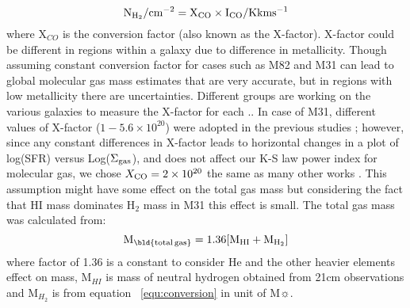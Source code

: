 \documentclass[useAMS,usenatbib]{mn2e}
\begin{document}
\begin{equation}
\label{equ:conversion}
\rm N_{H_2}/\rm cm^{-2} = X_{CO} \times I_{CO}/\rm K km s^{-1}
\end{equation}
where X$_{CO}$ is the conversion factor (also known as the X-factor). X-factor could be different in regions within a galaxy due to difference in metallicity. Though assuming constant conversion factor for cases such as M82 and M31 can lead to global molecular gas mass estimates that are very accurate,  but in regions with low metallicity there are uncertainties. Different groups are working on the various galaxies to measure the X-factor for each \citep{Wilson95, Bosselli02, Bolato13}.. In case of M31, different values of X-factor ($1-5.6 \times 10^{20}$) were adopted in the previous studies \citep[e.g.][]{Ford13, Bolato13, Leroy11, Bolato08, Nieten06, Sofue94, Strong88}; however, since any constant differences in X-factor leads to horizontal changes in a plot of log(SFR) versus Log($\Sigma_{\rm {gas}}$), and does not affect our K-S law power index for molecular gas,  we chose $X_{\rm {CO}}= 2 \times 10^{20}$  the same as many other works \citep[e.g.][]{Ford13, Smith12}. This assumption might have some effect on the total gas mass but considering the fact that HI mass dominates H$_2$ mass in M31 this effect is small.
The total gas mass was calculated from:
\begin{equation}
\label{equ:total_gas}
\rm M_{\rm \bld {total \, gas}} = 1.36[M_{HI}+M_{H_2}]
\end{equation}
where  factor of 1.36 is a constant to consider He and the other heavier elements effect on mass, M$_{HI}$ is mass of neutral hydrogen obtained from 21cm observations and M$_{H_2}$ is from equation ~\ref{equ:conversion} in unit of M$\sun$.

\end{document}

